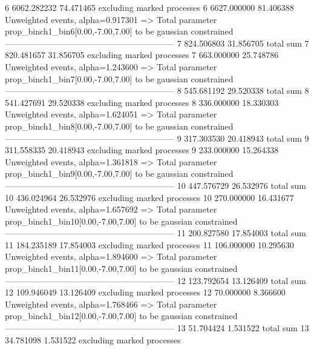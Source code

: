 6          6062.282232     74.471465       excluding marked processes    
6          6627.000000     81.406388       Unweighted events, alpha=0.917301
  => Total parameter prop_binch1_bin6[0.00,-7.00,7.00] to be gaussian constrained
------------------------------------------------------------
7          824.506803      31.856705       total sum                     
7          820.481657      31.856705       excluding marked processes    
7          663.000000      25.748786       Unweighted events, alpha=1.243600
  => Total parameter prop_binch1_bin7[0.00,-7.00,7.00] to be gaussian constrained
------------------------------------------------------------
8          545.681192      29.520338       total sum                     
8          541.427691      29.520338       excluding marked processes    
8          336.000000      18.330303       Unweighted events, alpha=1.624051
  => Total parameter prop_binch1_bin8[0.00,-7.00,7.00] to be gaussian constrained
------------------------------------------------------------
9          317.303530      20.418943       total sum                     
9          311.558335      20.418943       excluding marked processes    
9          233.000000      15.264338       Unweighted events, alpha=1.361818
  => Total parameter prop_binch1_bin9[0.00,-7.00,7.00] to be gaussian constrained
------------------------------------------------------------
10         447.576729      26.532976       total sum                     
10         436.024964      26.532976       excluding marked processes    
10         270.000000      16.431677       Unweighted events, alpha=1.657692
  => Total parameter prop_binch1_bin10[0.00,-7.00,7.00] to be gaussian constrained
------------------------------------------------------------
11         200.827580      17.854003       total sum                     
11         184.235189      17.854003       excluding marked processes    
11         106.000000      10.295630       Unweighted events, alpha=1.894600
  => Total parameter prop_binch1_bin11[0.00,-7.00,7.00] to be gaussian constrained
------------------------------------------------------------
12         123.792654      13.126409       total sum                     
12         109.946049      13.126409       excluding marked processes    
12         70.000000       8.366600        Unweighted events, alpha=1.768466
  => Total parameter prop_binch1_bin12[0.00,-7.00,7.00] to be gaussian constrained
------------------------------------------------------------
13         51.704424       1.531522        total sum                     
13         34.781098       1.531522        excluding marked processes    
